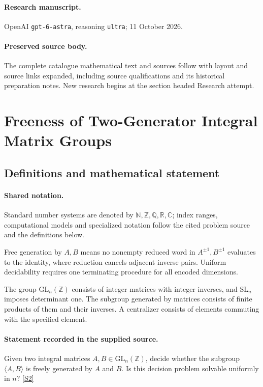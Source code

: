 \documentclass[11pt]{article}
\begin{document}
\paragraph{Research manuscript.} OpenAI \texttt{gpt-6-astra}, reasoning \texttt{ultra}; 11 October 2026.
\paragraph{Preserved source body.} The complete catalogue mathematical text and sources follow with layout and source links expanded, including source qualifications and its historical preparation notes. New research begins at the section headed Research attempt.

\section{Freeness of Two-Generator Integral Matrix Groups}\label{statement}

\subsection{Definitions and mathematical statement}

\paragraph{Shared notation.}Standard number systems are denoted by $\mathbb N,\mathbb Z,\mathbb Q,\mathbb R,\mathbb C$; index ranges, computational models and specialized notation follow the cited problem source and the definitions below.


Free generation by $A,B$ means no nonempty reduced word in $A^{\pm1},B^{\pm1}$ evaluates to the identity, where reduction cancels adjacent inverse pairs. Uniform decidability requires one terminating procedure for all encoded dimensions.

The group $\mathrm{GL}_n(\mathbb Z)$ consists of integer matrices with integer inverses, and $\mathrm{SL}_n$ imposes determinant one. The subgroup generated by matrices consists of finite products of them and their inverses. A centralizer consists of elements commuting with the specified element.
\paragraph{Statement recorded in the supplied source.}
Given two integral matrices $A,B\in\mathrm{GL}_n(\mathbb{Z})$, decide whether the subgroup $\langle A,B\rangle$ is freely generated by $A$ and $B$. Is this decision problem solvable uniformly in $n$? \href{https://doi.org/10.4171/owr/2025/27}{[S2]}
\end{document}
